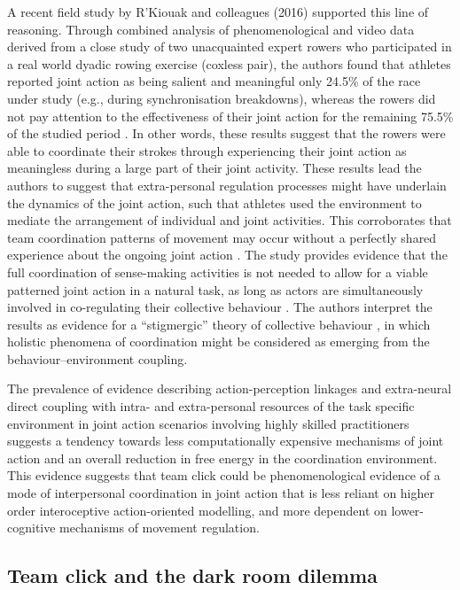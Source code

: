\begin{CJK}{UTF8}{gbsn}
A recent field study by R'Kiouak and colleagues (2016) supported this line of reasoning.  Through combined analysis of phenomenological and video data derived from a close study of two unacquainted expert rowers who participated in a real world dyadic rowing exercise (coxless pair), the authors found that athletes reported joint action as being salient and meaningful only 24.5\% of the race under study (e.g., during synchronisation breakdowns), whereas the rowers did not pay attention to the effectiveness of their joint action for the remaining 75.5\% of the studied period \citep{RKiouak2016}.  In other words, these results suggest that the rowers were able to coordinate their strokes through experiencing their joint action as meaningless during a large part of their joint activity.  These results lead the authors to suggest that extra-personal regulation processes might have underlain the dynamics of the joint action, such that athletes used the environment to mediate the arrangement of individual and joint activities. This corroborates that team coordination patterns of movement may occur without a perfectly shared experience about the ongoing joint action \citep{Bourbousson2011,Bourbousson2012}. The study provides evidence that the full coordination of sense-making activities is not needed to allow for a viable patterned joint action in a natural task, as long as actors are simultaneously involved in co-regulating their collective behaviour \citep{Froese2011,Froese2014}.
The authors interpret the results as evidence for a ``stigmergic'' theory of collective behaviour  \citep{Susi2001,Avvenuti2013}, in which holistic phenomena of coordination might be considered as emerging from the behaviour–environment coupling.

The prevalence of evidence describing action-perception linkages and extra-neural direct coupling with intra- and extra-personal resources of the task specific environment in joint action scenarios involving highly skilled practitioners suggests a tendency towards less computationally expensive mechanisms of joint action and an overall reduction in free energy in the coordination environment.  This evidence suggests that team click could be phenomenological evidence of a mode of interpersonal coordination in joint action that is less reliant on higher order interoceptive action-oriented modelling, and more dependent on lower-cognitive mechanisms of movement regulation.



\subsection{Team click and the dark room dilemma}


\end{CJK}
